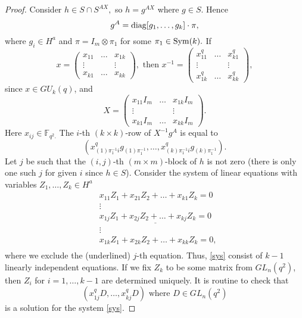 \begin{proof}
Consider $h \in S\cap S^{AX},$ so $h=g^{AX}$ where $g  \in S.$ Hence 
$$g^A = \mathrm{diag}[g_1, \ldots , g_k] \cdot \pi,$$ where $g_i \in H^a$ and $\pi=I_m \otimes \pi_1 $ for some $\pi_1 \in \mathrm{Sym}(k).$ If 
\begin{equation*}
x=
\begin{pmatrix}
x_{11} & \ldots & x_{1k}\\
\vdots & & \vdots \\
x_{k1} & \ldots & x_{kk}
\end{pmatrix}, \text{ then }
x^{-1}=
\begin{pmatrix}
x_{11}^q & \ldots & x_{k1}^q\\
\vdots & & \vdots \\
x_{1k}^q & \ldots & x_{kk}^q
\end{pmatrix},
\end{equation*}
since $x \in GU_k(q)$, and
\begin{equation*}
X=
\begin{pmatrix}
x_{11} I_m & \ldots & x_{1k} I_m\\
\vdots & & \vdots \\
x_{k1} I_m & \ldots & x_{kk} I_m
\end{pmatrix}. 
\end{equation*}
Here $x_{ij} \in \mathbb{F}_{q^2.}$ The $i$-th $(k\times k)$-row of $X^{-1}g^A$  is equal to 
\begin{equation}\label{garow}
(x_{(1)\pi_1^{-1}i}^q g_{(1)\pi_1^{-1}}, \ldots, x_{(k)\pi_1^{-1}i}^q g_{(k)\pi_1^{-1}}).
\end{equation} 
Let  $j$ be such that the $(i,j)$-th $(m \times m)$-block of $h$ is not zero (there is only one such $j$ for given $i$ since $h \in S$). Consider the system of linear equations with variables $Z_1, \ldots, Z_k \in H^a$
\begin{equation}\label{sys}
\begin{split}
&x_{11}Z_1+x_{21}  Z_2 + \ldots + x_{k1}Z_k=0\\
&\vdots\\
&\underline{x_{1j} Z_1+x_{2j}Z_2 + \ldots + x_{kj}Z_k=0} \\
& \vdots\\
&x_{1k}Z_1+x_{2k}  Z_2 + \ldots + x_{kk}Z_k=0,\\
\end{split}
\end{equation}
where we exclude the (underlined) $j$-th equation. Thus,  \eqref{sys} consist of $k-1$ linearly independent equations. If we fix $Z_k$ to be some matrix from $GL_n(q^2)$, then $Z_i$ for $i=1, \ldots, k-1$ are  determined uniquely. It is routine to check that 
$$(x_{1j}^q D, \ldots, x_{kj}^q D) \text{ where } D\in GL_n(q^2)$$
is a solution for the system \eqref{sys}. 


\end{proof}
